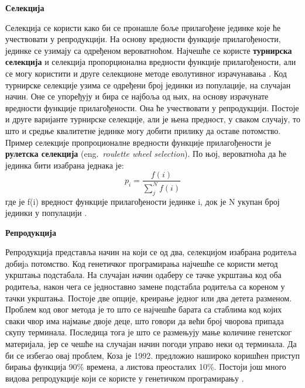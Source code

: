 \documentclass[a4paper]{article}
\begin{document}
\medskip
\noindent
\textbf{\large Селекција}\newline

Селекција се користи како би се пронашле боље прилагођене јединке које ће учествовати у репродукцији. На основу вредности функције прилагођености, јединке се узимају са одређеном вероватноћом. Најчешће се користе \textbf{турнирска селекција} и селекција пропорционална вредности функције прилагођености, али се могу користити и друге селекционе методе еволутивног израчунавања \cite{compIntelligence}. Код турнирске селекције узима се одређени број јединки из популације, на случајан начин. Оне се упоређују и бира се најбоља од њих, на основу израчунате вредности функције прилагођености. Она ће учествовати у репродукцији. Постоје и друге варијанте турнирске селекције, али је њена предност, у сваком случају, то што и средње квалитетне јединке могу добити прилику да оставе потомство. Пример селекције пропроционалне вредности функције прилагођености је \textbf{рулетска селекција} (eng.~{\em roulette wheel selection}). По њој, вероватноћа да ће јединка бити изабрана једнака је: 
\begin{equation} 
    p_i = \frac{f(i)}{\sum_{j}^{N} f(i)}
\end{equation}
где је f(i) вредност функције прилагођености јединке i, док је N укупан број јединки у популацији \cite{vi}.\newline


\medskip
\noindent
\textbf{\large Репродукција}\newline
\label{text:reprodukcija}

Репродукција представља начин на који се од два, селекцијом изабрана родитеља добијa потомство. Код генетичког програмирања најчешће се користи метод укрштања подстабала. На случајан начин одаберу се тачке укрштања код оба родитеља, након чега се једноставно замене подстабла родитеља са кореном у тачки укрштања. Постоје две опције, креирање једног или два детета разменом. Проблем код овог метода је то што се најчешће барата са стаблима код којих сваки чвор има најмање двоје деце, што говори да већи број чворова припада скупу терминала. Последица тога је што се размењују мање количине генетског материјала, јер се чешће на случајан начин погоди управо неки од терминала. Да би се избегао овај проблем, Коза је 1992. предложио нашироко коришћен приступ бирања функција 90\% времена, а листова преосталих 10\%. Постоји још много видова репродукције који се користе у генетичком програмирању \cite{fieldGuidetoGP}.\newline
\end{document}
